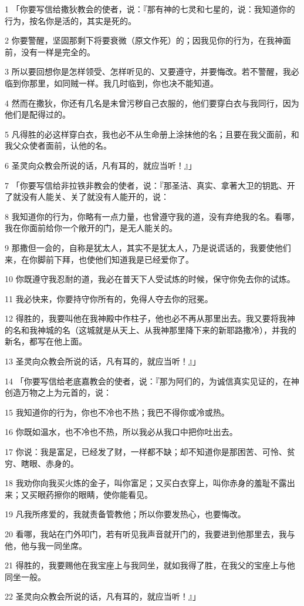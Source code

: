 \par 1 「你要写信给撒狄教会的使者，说：『那有神的七灵和七星的，说：我知道你的行为，按名你是活的，其实是死的。
\par 2 你要警醒，坚固那剩下将要衰微（原文作死）的；因我见你的行为，在我神面前，没有一样是完全的。
\par 3 所以要回想你是怎样领受、怎样听见的、又要遵守，并要悔改。若不警醒，我必临到你那里，如同贼一样。我几时临到，你也决不能知道。
\par 4 然而在撒狄，你还有几名是未曾污秽自己衣服的，他们要穿白衣与我同行，因为他们是配得过的。
\par 5 凡得胜的必这样穿白衣，我也必不从生命册上涂抹他的名；且要在我父面前，和我父众使者面前，认他的名。
\par 6 圣灵向众教会所说的话，凡有耳的，就应当听！』」
\par 7 「你要写信给非拉铁非教会的使者，说：『那圣洁、真实、拿著大卫的钥匙、开了就没有人能关、关了就没有人能开的，说：
\par 8 我知道你的行为，你略有一点力量，也曾遵守我的道，没有弃绝我的名。看哪，我在你面前给你一个敞开的门，是无人能关的。
\par 9 那撒但一会的，自称是犹太人，其实不是犹太人，乃是说谎话的，我要使他们来，在你脚前下拜，也使他们知道我是已经爱你了。
\par 10 你既遵守我忍耐的道，我必在普天下人受试炼的时候，保守你免去你的试炼。
\par 11 我必快来，你要持守你所有的，免得人夺去你的冠冕。
\par 12 得胜的，我要叫他在我神殿中作柱子，他也必不再从那里出去。我又要将我神的名和我神城的名（这城就是从天上、从我神那里降下来的新耶路撒冷），并我的新名，都写在他上面。
\par 13 圣灵向众教会所说的话，凡有耳的，就应当听！』」
\par 14 「你要写信给老底嘉教会的使者，说：『那为阿们的，为诚信真实见证的，在神创造万物之上为元首的，说：
\par 15 我知道你的行为，你也不冷也不热；我巴不得你或冷或热。
\par 16 你既如温水，也不冷也不热，所以我必从我口中把你吐出去。
\par 17 你说：我是富足，已经发了财，一样都不缺；却不知道你是那困苦、可怜、贫穷、瞎眼、赤身的。
\par 18 我劝你向我买火炼的金子，叫你富足；又买白衣穿上，叫你赤身的羞耻不露出来；又买眼药擦你的眼睛，使你能看见。
\par 19 凡我所疼爱的，我就责备管教他；所以你要发热心，也要悔改。
\par 20 看哪，我站在门外叩门，若有听见我声音就开门的，我要进到他那里去，我与他，他与我一同坐席。
\par 21 得胜的，我要赐他在我宝座上与我同坐，就如我得了胜，在我父的宝座上与他同坐一般。
\par 22 圣灵向众教会所说的话，凡有耳的，就应当听！』」

